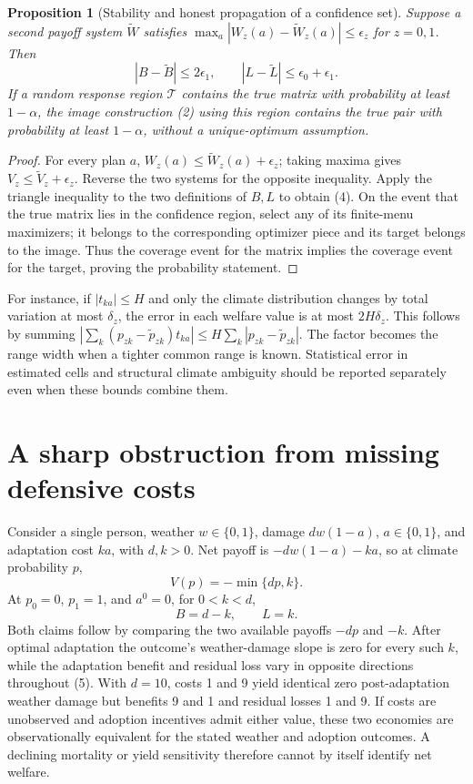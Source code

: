 \documentclass[11pt]{article}
\newtheorem{proposition}[theorem]{Proposition}
\begin{document}
\begin{proposition}[Stability and honest propagation of a confidence set]
Suppose a second payoff system $\widetilde W$ satisfies
$\max_a|W_z(a)-\widetilde W_z(a)|\leq\epsilon_z$ for $z=0,1$.
Then
\[
 |B-\widetilde B|\leq2\epsilon_1,\qquad
 |L-\widetilde L|\leq\epsilon_0+\epsilon_1.           \tag{4}
\]
If a random response region $\widehat{\mathcal T}$ contains the true
matrix with probability at least $1-\alpha$, the image construction (2)
using this region contains the true pair with probability at least
$1-\alpha$, without a unique-optimum assumption.
\end{proposition}
\begin{proof}
For every plan $a$, $W_z(a)\leq\widetilde W_z(a)+\epsilon_z$;
taking maxima gives $V_z\leq\widetilde V_z+\epsilon_z$. Reverse the
two systems for the opposite inequality. Apply the triangle inequality
to the two definitions of $B,L$ to obtain (4). On the event that the true
matrix lies in the confidence region, select any of its finite-menu
maximizers; it belongs to the corresponding optimizer piece and its target
belongs to the image. Thus the coverage event for the matrix implies the
coverage event for the target, proving the probability statement.
\end{proof}

For instance, if $|t_{ka}|\leq H$ and only the climate distribution
changes by total variation at most $\delta_z$, the error in each welfare
value is at most $2H\delta_z$. This follows by summing
$|\sum_k(p_{zk}-\widetilde p_{zk})t_{ka}|
\leq H\sum_k|p_{zk}-\widetilde p_{zk}|$.
The factor becomes the range width when a tighter common range is known.
Statistical error in estimated cells and structural climate ambiguity
should be reported separately even when these bounds combine them.

\section{A sharp obstruction from missing defensive costs}
Consider a single person, weather $w\in\{0,1\}$, damage $dw(1-a)$,
$a\in\{0,1\}$, and adaptation cost $ka$, with $d,k>0$.
Net payoff is $-dw(1-a)-ka$, so at climate probability $p$,
\[
 V(p)=-\min\{dp,k\}.
\]
At $p_0=0$, $p_1=1$, and $a^0=0$, for $0<k<d$,
\[
 B=d-k,\qquad L=k.                                  \tag{5}
\]
Both claims follow by comparing the two available payoffs $-dp$ and $-k$.
After optimal adaptation the outcome's weather-damage slope is zero for
every such $k$, while the adaptation benefit and residual loss vary in
opposite directions throughout (5). With $d=10$, costs 1 and 9 yield
identical zero post-adaptation weather damage but benefits 9 and 1 and
residual losses 1 and 9. If costs are unobserved and adoption incentives
admit either value, these two economies are observationally equivalent
for the stated weather and adoption outcomes. A declining mortality or
yield sensitivity therefore cannot by itself identify net welfare.
\end{document}
